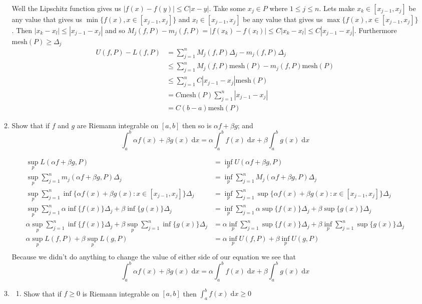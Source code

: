 \documentclass[letterpaper]{article}
\begin{document}
\begin{enumerate}
\begin{enumerate}
  Well the Lipschitz function gives us $|f(x)-f(y)|\le C|x-y|$. Take some $x_j\in P$ where $1\le j\le n$. Lets make $x_k\in [x_{j-1},x_j]$ be any value that gives us $\min\{f(x),x\in[x_{j-1},x_j]\}$ and $x_l\in [x_{j-1},x_j]$ be any value that gives us $\max\{f(x),x\in[x_{j-1},x_j]\}$. Then $|x_k-x_l|\le |x_{j-1}-x_j|$ and so $M_j(f,P)-m_j(f,P)=|f(x_k)-f(x_l)|\le C|x_k-x_l|\le C|x_{j-1}-x_j|$. Furthermore $\text{mesh}(P)\ge \Delta_j$
  \begin{align*}
    U(f,P)-L(f,P)&=\sum\limits_{j=1}^n{M_j(f,P)\Delta_j-m_j(f,P)\Delta_j}\\
    &\le\sum\limits_{j=1}^n{M_j(f,P)\text{mesh}(P)-m_j(f,P)\text{mesh}(P)}\\
    &\le\sum\limits_{j=1}^n{C|x_{j-1}-x_j|\text{mesh}(P)}\\
    &=C\text{mesh}(P)\sum\limits_{j=1}^n{|x_{j-1}-x_j|}\\
    &=C(b-a)\text{mesh}(P)
  \end{align*}
  \item
  Show that if $f$ and $g$ are Riemann integrable on $[a,b]$ then so is $\alpha f+\beta g$; and
  \[\int_a^b{\alpha f(x)+\beta g(x)\;\mathrm{d}x}=\alpha\int_a^b{f(x)\;\mathrm{d}x}+\beta\int_a^b{g(x)\;\mathrm{d}x}\]

  \begin{align*}
    {\sup}_p L(\alpha f+\beta g,P)&={\inf}_p U(\alpha f+\beta g,P)\\
    {\sup}_p \sum\limits_{j=1}^n{m_j(\alpha f+\beta g,P)\Delta_j}&={\inf}_p \sum\limits_{j=1}^n{M_j(\alpha f+\beta g,P)\Delta_j}\\
    {\sup}_p \sum\limits_{j=1}^n{\inf\{\alpha f(x)+\beta g(x):x\in[x_{j-1},x_j]\}\Delta_j}&={\inf}_p \sum\limits_{j=1}^n{\sup\{\alpha f(x)+\beta g(x):x\in[x_{j-1},x_j]\}\Delta_j}\\
    {\sup}_p \sum\limits_{j=1}^n{\alpha\inf\{ f(x)\}\Delta_j+\beta\inf\{ g(x)\}\Delta_j}&={\inf}_p \sum\limits_{j=1}^n{\alpha\sup\{ f(x)\}\Delta_j+\beta \sup\{ g(x)\}\Delta_j}\\
    \alpha{\sup}_p \sum\limits_{j=1}^n{\inf\{ f(x)\}\Delta_j}+\beta{\sup}_p\sum\limits_{j=1}^n{\inf\{ g(x)\}\Delta_j}&=\alpha{\inf}_p \sum\limits_{j=1}^n{\sup\{ f(x)\}\Delta_j}+\beta{\inf}_p \sum\limits_{j=1}^n{ \sup\{ g(x)\}\Delta_j}\\
    \alpha{\sup}_p L(f,P)+\beta{\sup}_pL(g,P)&=\alpha{\inf}_p U(f,P)+\beta{\inf}_p U(g,P)\\
  \end{align*}
  Because we didn't do anything to change the value of either side of our equation we see that
  \[\int_a^b{\alpha f(x)+\beta g(x)\;\mathrm{d}x}=\alpha\int_a^b{f(x)\;\mathrm{d}x}+\beta\int_a^b{g(x)\;\mathrm{d}x}\]
  \setcounter{enumii}{7}
  \item
    \begin{enumerate}
    \item
    Show that if $f\ge 0$ is Riemann integrable on $[a,b]$ then $\int_a^b{f(x)\;\mathrm{d}x}\ge 0$


\end{enumerate}
\end{enumerate}
\end{enumerate}
\end{document}
